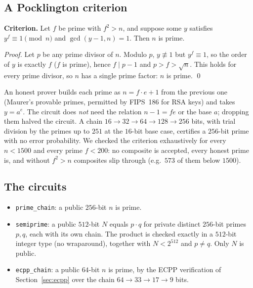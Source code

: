 \documentclass[12pt]{article}
\begin{document}
\subsection*{A Pocklington criterion}

\textbf{Criterion.} Let $f$ be prime with $f^2 > n$, and suppose some $y$ satisfies $y^f \equiv 1 \pmod n$ and $\gcd(y-1, n) = 1$. Then $n$ is prime.

\emph{Proof.} Let $p$ be any prime divisor of $n$. Modulo $p$, $y \not\equiv 1$ but $y^f \equiv 1$, so the order of $y$ is exactly $f$ ($f$ is prime), hence $f \mid p-1$ and $p > f > \sqrt n$. This holds for every prime divisor, so $n$ has a single prime factor: $n$ is prime. \qed

An honest prover builds each prime as $n = f\cdot e + 1$ from the previous one (Maurer's provable primes, permitted by FIPS~186 for RSA keys) and takes $y = a^e$. The circuit does \emph{not} need the relation $n-1 = fe$ or the base $a$; dropping them halved the circuit. A chain $16 \to 32 \to 64 \to 128 \to 256$ bits, with trial division by the primes up to $251$ at the $16$-bit base case, certifies a $256$-bit prime with no error probability. We checked the criterion exhaustively for every $n < 1500$ and every prime $f < 200$: no composite is accepted, every honest prime is, and without $f^2 > n$ composites slip through (e.g.\ $573$ of them below $1500$).

\subsection*{The circuits}

\begin{itemize}
    \item \texttt{prime\_chain}: a public $256$-bit $n$ is prime.
    \item \texttt{semiprime}: a public $512$-bit $N$ equals $p\cdot q$ for private distinct $256$-bit primes $p,q$, each with its own chain. The product is checked exactly in a $512$-bit integer type (no wraparound), together with $N<2^{512}$ and $p\ne q$. Only $N$ is public.
    \item \texttt{ecpp\_chain}: a public $64$-bit $n$ is prime, by the ECPP verification of Section~\ref{sec:ecpp} over the chain $64 \to 33 \to 17 \to 9$ bits.
\end{itemize}
\end{document}
